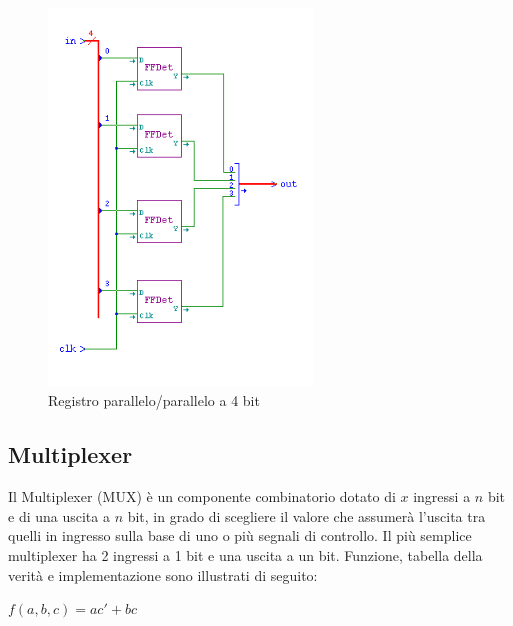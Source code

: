 \documentclass[10pt]{article}
\begin{document}
\begin{itemize}
\begin{figure}[H]
    \begin{minipage}[b]{\textwidth}
    \centering
    \includegraphics[width=70mm]{reg4}
    \caption{Registro parallelo/parallelo a 4 bit}
    \label{ }
    \end{minipage}
    \end{figure}

\subsection{Multiplexer}
Il Multiplexer (MUX) è un componente combinatorio dotato di $x$ ingressi a $n$ bit e di una uscita a $n$ bit, in grado di scegliere il valore che assumerà l'uscita tra quelli in ingresso sulla base di uno o più segnali
di controllo. Il più semplice multiplexer ha 2 ingressi a 1 bit e una uscita a un bit. Funzione, tabella della verità e implementazione sono illustrati di seguito:

$f(a,b,c) = ac' + bc$


\end{itemize}
\end{document}

